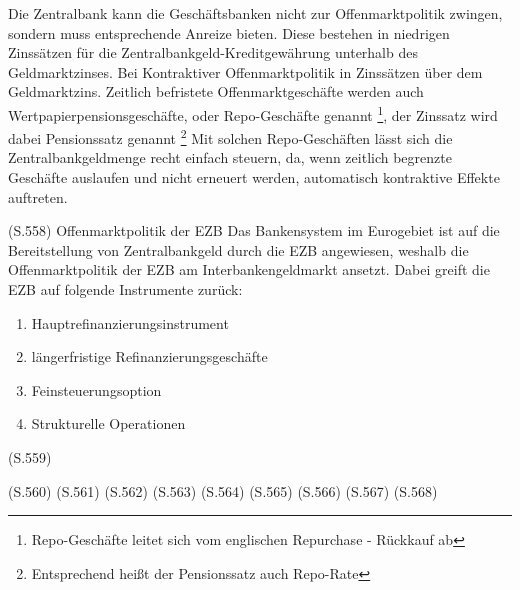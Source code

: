 \documentclass[
      onecolumn,
      a4paper,
      abstracton,
      parskip=half
      ,final
      ]{scrartcl}
\begin{document}
Die Zentralbank kann die Geschäftsbanken nicht zur Offenmarktpolitik zwingen, sondern muss entsprechende Anreize bieten. Diese bestehen in niedrigen Zinssätzen für die Zentralbankgeld-Kreditgewährung unterhalb des Geldmarktzinses. Bei Kontraktiver Offenmarktpolitik in Zinssätzen über dem Geldmarktzins.
Zeitlich befristete Offenmarktgeschäfte werden auch Wertpapierpensionsgeschäfte, oder Repo-Geschäfte genannt \footnote[36]{Repo-Geschäfte leitet sich vom englischen Repurchase - Rückkauf ab}, der Zinssatz wird dabei Pensionssatz genannt \footnote[37]{Entsprechend heißt der Pensionssatz auch Repo-Rate}
Mit solchen Repo-Geschäften lässt sich die Zentralbankgeldmenge recht einfach steuern, da, wenn zeitlich begrenzte Geschäfte auslaufen und nicht erneuert werden, automatisch kontraktive Effekte auftreten.


(S.558)
Offenmarktpolitik der EZB
Das Bankensystem im Eurogebiet ist auf die Bereitstellung von Zentralbankgeld durch die EZB angewiesen, weshalb die Offenmarktpolitik der EZB am Interbankengeldmarkt ansetzt. Dabei greift die EZB auf folgende Instrumente zurück:
\begin{enumerate}
  \item{Hauptrefinanzierungsinstrument}  \item{längerfristige Refinanzierungsgeschäfte}  \item{Feinsteuerungsoption} \item{Strukturelle Operationen}
  \end{enumerate}


(S.559)

(S.560)
(S.561)
(S.562)
(S.563)
(S.564)
(S.565)
(S.566)
(S.567)
(S.568)
\end{document}
